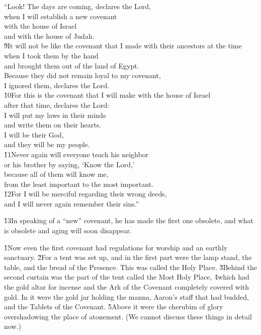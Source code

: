 \begin{poetry}
\poeml ``Look! The days are coming, declares the Lord, \\
\poemll    when I will establish a new covenant \\
\poemlll       with the house of Israel \\
\poemlll       and with the house of Judah. \\
\poeml \v{9}It will not be like the covenant that I made with their ancestors at the time \\
\poemll    when I took them by the hand \\
\poemlll       and brought them out of the land of Egypt. \\
\poeml Because they did not remain loyal to my covenant, \\
\poemll    I ignored them, declares the Lord. \\
\poeml \v{10}For this is the covenant that I will make with the house of Israel \\
\poemll    after that time, declares the Lord: \\
\poeml I will put my laws in their minds \\
\poemll    and write them on their hearts. \\
\poeml I will be their God, \\
\poemll    and they will be my people. \\
\poeml \v{11}Never again will everyone teach his neighbor \\
\poemll    or his brother by saying, `Know the Lord,' \\
\poeml because all of them will know me, \\
\poemll    from the least important to the most important. \\
\poeml \v{12}For I will be merciful regarding their wrong deeds, \\
\poemll    and I will never again remember their sins.''
\end{poetry}

\v{13}In speaking of a ``new'' covenant, he has made the first one obsolete, and what is obsolete and aging will soon disappear.

\v{1}Now even the first covenant had regulations for worship and an earthly sanctuary. \v{2}For a tent was set up, and in the first part were the lamp stand, the table, and the bread of the Presence. This was called the Holy Place. \v{3}Behind the second curtain was the part of the tent called the Most Holy Place, \v{4}which had the gold altar for incense and the Ark of the Covenant completely covered with gold. In it were the gold jar holding the manna, Aaron's staff that had budded, and the Tablets of the Covenant. \v{5}Above it were the cherubim of glory overshadowing the place of atonement. (We cannot discuss these things in detail now.)

